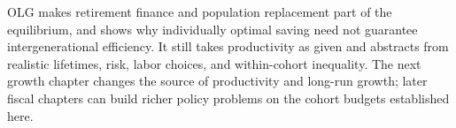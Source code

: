 OLG makes retirement finance and population replacement part of the equilibrium,
and shows why individually optimal saving need not guarantee intergenerational
efficiency. It still takes productivity as given and abstracts from realistic
lifetimes, risk, labor choices, and within-cohort inequality. The next growth
chapter changes the source of productivity and long-run growth; later fiscal
chapters can build richer policy problems on the cohort budgets established here.
